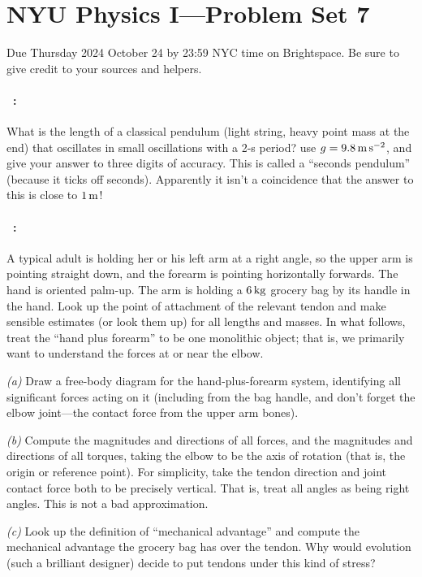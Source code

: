 \documentclass[12pt]{article}
\begin{document}
\section*{NYU Physics I---Problem Set 7}

Due Thursday 2024 October 24 by 23:59 NYC time on Brightspace.
Be sure to give credit to your sources and helpers.

\paragraph{\problemname~\theproblem:}%
What is the length of a classical pendulum (light string, heavy point
mass at the end) that oscillates in small oscillations with a
2-s period? use $g=9.8\,\mathrm{m}\,\mathrm{s}^{-2}$, and give your answer to three digits of
accuracy. This is called a ``seconds pendulum'' (because it ticks off
seconds). Apparently it isn't a coincidence that the answer to this is
close to $1\,\mathrm{m}$!

\paragraph{\problemname~\theproblem:}%
A typical adult is holding her or his left arm at a right angle, so the
upper arm is pointing straight down, and the forearm is pointing
horizontally forwards.  The hand is oriented palm-up.  The arm is holding a
$6\,\mathrm{kg}$ grocery bag by its handle in the hand.  Look up the
point of attachment of the relevant tendon and make sensible estimates
(or look them up) for all lengths and masses.  In what follows, treat
the ``hand plus forearm'' to be one monolithic object; that is, we
primarily want to understand the forces at or near the elbow.

\textsl{(a)} Draw a free-body diagram for the hand-plus-forearm
system, identifying all significant forces acting on it (including
from the bag handle, and don't forget the elbow joint---the contact
force from the upper arm bones).

\textsl{(b)} Compute the magnitudes and directions of all forces, and
the magnitudes and directions of all torques, taking the elbow to be
the axis of rotation (that is, the origin or reference point).  For
simplicity, take the tendon direction and joint contact force both to
be precisely vertical.  That is, treat all angles as being right
angles.  This is not a bad approximation.

\textsl{(c)} Look up the definition of ``mechanical advantage'' and
compute the mechanical advantage the grocery bag has over the tendon.
Why would evolution (such a brilliant designer) decide to put tendons
under this kind of stress?
\end{document}
